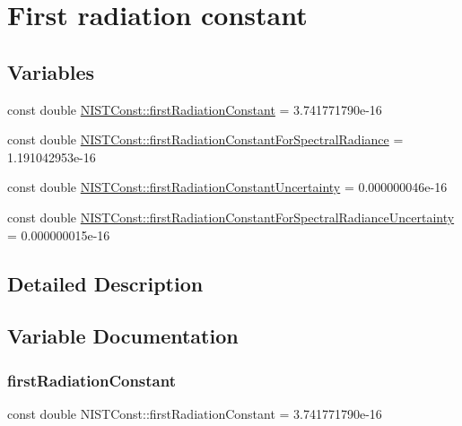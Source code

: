 \hypertarget{group___first_radiation_constant}{}\section{First radiation constant}
\label{group___first_radiation_constant}
\subsection*{Variables}
\begin{DoxyCompactItemize}
\item 
const double \hyperlink{group___first_radiation_constant_ga59a54a84c539969a14695bd822b116cb}{N\+I\+S\+T\+Const\+::first\+Radiation\+Constant} = 3.\+741771790e-\/16
\item 
const double \hyperlink{group___first_radiation_constant_ga877c0bc2579b88ae515b80aeb58aa68e}{N\+I\+S\+T\+Const\+::first\+Radiation\+Constant\+For\+Spectral\+Radiance} = 1.\+191042953e-\/16
\item 
const double \hyperlink{group___first_radiation_constant_ga1b1ea4335364c4f0b19810842fd6c741}{N\+I\+S\+T\+Const\+::first\+Radiation\+Constant\+Uncertainty} = 0.\+000000046e-\/16
\item 
const double \hyperlink{group___first_radiation_constant_gaa5c56cdaf9f43061450ff67b73dbba35}{N\+I\+S\+T\+Const\+::first\+Radiation\+Constant\+For\+Spectral\+Radiance\+Uncertainty} = 0.\+000000015e-\/16
\end{DoxyCompactItemize}


\subsection{Detailed Description}


\subsection{Variable Documentation}
\mbox{\label{group___first_radiation_constant_ga59a54a84c539969a14695bd822b116cb}} 
\subsubsection{\texorpdfstring{first\+Radiation\+Constant}{firstRadiationConstant}}
{\footnotesize\ttfamily const double N\+I\+S\+T\+Const\+::first\+Radiation\+Constant = 3.\+741771790e-\/16}

